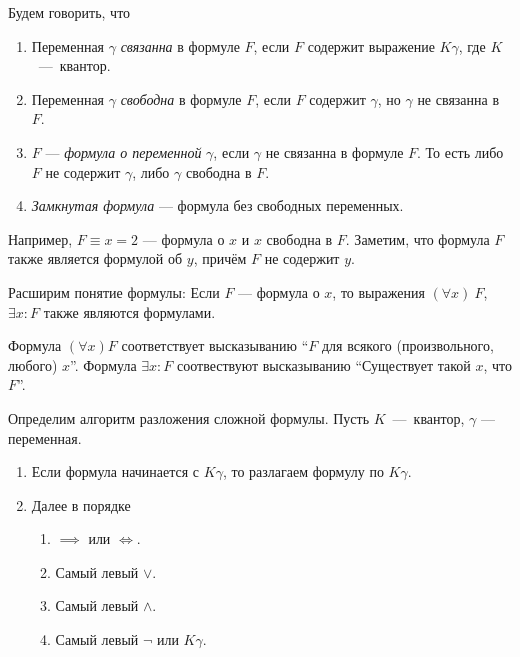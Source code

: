 \pagebreak
Будем говорить, что
\begin{enumerate}
  \item{}Переменная $\gamma$ {\it связанна}
  в формуле $F$, если $F$ содержит
  выражение $K\gamma$, где $K$~---~квантор.

  \item{}Переменная $\gamma$ {\it свободна}
  в формуле $F$, если $F$ содержит $\gamma$,
  но $\gamma$ не связанна в $F$.

  \item{}$F$ --- {\it формула о переменной} $\gamma$, если $\gamma$
  не связанна в формуле $F$.
  То есть либо $F$ не содержит $\gamma$, либо $\gamma$ свободна в $F$.

  \item{}{\it Замкнутая формула} --- формула без свободных переменных.
\end{enumerate}

Например, $F\equiv x=2$ --- формула о $x$ и $x$ свободна в $F$.
Заметим, что формула $F$ также является формулой об $y$, причём $F$ не содержит $y$.

Расширим понятие формулы:
Если $F$ --- формула о $x$, то выражения $(\forall x)~F$, $\exists x:F$
также являются формулами.

Формула $(\forall x)F$ соответствует высказыванию
``$F$ для всякого (произвольного, любого) $x$''.
Формула $\exists x:F$ соотвествуют высказыванию
``Существует такой $x$, что $F$''.

Определим алгоритм разложения сложной формулы.
Пусть $K$~---~квантор, $\gamma$ --- переменная.
\begin{enumerate}
  \item{}Если формула начинается с $K\gamma$, то разлагаем формулу по $K\gamma$.
  \item{}Далее в порядке
  \begin{multicols}{2}
    \begin{enumerate}
      \item{}$\implies$ или $\iff$.
      \item{}Самый левый $\lor$.
      \item{}Самый левый $\land$.
      \item{}Самый левый $\lnot$ или $K\gamma$.
    \end{enumerate}
  \end{multicols}
\end{enumerate}

